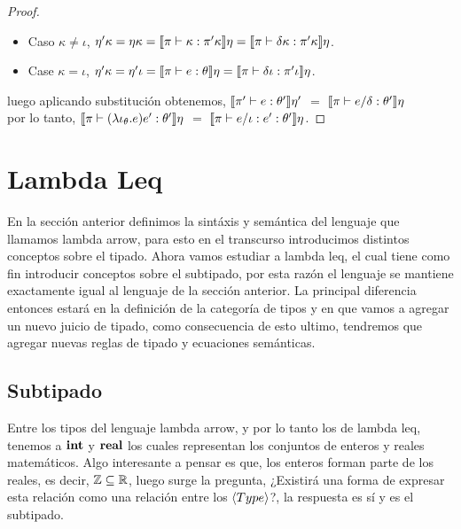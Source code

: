 \begin{proof}
\begin{itemize}
\item Caso $\kappa \neq \iota$, $\eta' \kappa = \eta \kappa = 
									\llbracket \pi \vdash \kappa : \pi'\kappa \rrbracket\eta = 
									\llbracket \pi \vdash \delta \kappa : \pi'\kappa \rrbracket\eta$.

\item Case $\kappa = \iota$, $\eta' \kappa = \eta' \iota = 
									 \llbracket \pi \vdash e : \theta \rrbracket\eta = 
									 \llbracket \pi \vdash \delta \iota : \pi'\iota \rrbracket\eta$.
\end{itemize}

luego aplicando substituci\'on obtenemos,
$\llbracket \pi' \vdash e : \theta' \rrbracket\eta'$ $=$ $\llbracket \pi \vdash e / \delta : \theta' \rrbracket\eta$\\

por lo tanto, $\llbracket \pi \vdash (\lambda \iota_{\theta} . e)e' : \theta' \rrbracket\eta$ $=$
 			  $\llbracket \pi \vdash e / \iota:e' : \theta' \rrbracket\eta$.

\end{proof}


\section{Lambda Leq}

En la secci\'on anterior definimos la sint\'axis y sem\'antica del lenguaje que llamamos
lambda arrow, para esto en el transcurso introducimos distintos conceptos sobre el tipado.
Ahora vamos estudiar a lambda leq, el cual tiene como fin introducir conceptos sobre
el subtipado, por esta raz\'on el lenguaje se mantiene exactamente igual al lenguaje 
de la secci\'on anterior. La principal diferencia entonces estar\'a en la definici\'on
de la categor\'ia de tipos y en que vamos a agregar un nuevo juicio de tipado, como
consecuencia de esto ultimo, tendremos que agregar nuevas reglas de tipado y ecuaciones 
sem\'anticas.\\

\subsection{Subtipado}

Entre los tipos del lenguaje lambda arrow, y por lo tanto los de lambda leq, tenemos
a $\textbf{int}$ y $\textbf{real}$ los cuales representan los conjuntos de enteros y reales matem\'aticos.
Algo interesante a pensar es que, los enteros forman parte de los reales, es decir,
$\mathbb{Z} \subseteq \mathbb{R}$, luego surge la pregunta, ¿Existir\'a una forma de expresar esta relaci\'on 
como una relaci\'on entre los $\langle Type \rangle$?, la respuesta es s\'i y es el subtipado.\\

